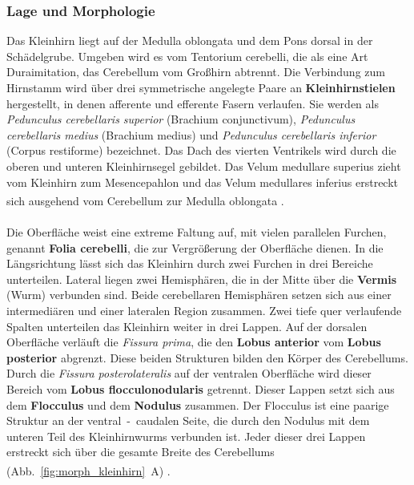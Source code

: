 \documentclass[12pt,a4paper,pdftex]{article}
\begin{document}
\subsubsection{Lage und Morphologie}
Das Kleinhirn liegt auf der Medulla oblongata und dem Pons dorsal in der Schädelgrube. Umgeben wird es vom Tentorium cerebelli, die als eine Art Duraimitation, das Cerebellum vom Großhirn abtrennt. Die Verbindung zum Hirnstamm wird über drei symmetrische angelegte Paare an \textbf{Kleinhirnstielen}  hergestellt, in denen afferente und efferente Fasern verlaufen. Sie werden als \textit{Pedunculus cerebellaris superior} (Brachium conjunctivum), \textit{Pedunculus cerebellaris medius} (Brachium medius)  und \textit{Pedunculus cerebellaris inferior} (Corpus restiforme)  bezeichnet.  Das Dach des vierten Ventrikels wird durch die oberen und unteren Kleinhirnsegel  gebildet. Das Velum medullare superius zieht vom Kleinhirn zum Mesencepahlon und das Velum medullares inferius erstreckt sich ausgehend vom Cerebellum zur Medulla oblongata \textsuperscript{\cite[7]{trepel2011neuroanatomie}}. \\
\\ \noindent Die Oberfläche weist eine extreme Faltung auf, mit vielen parallelen Furchen, genannt \textbf{Folia cerebelli}, die zur Vergrößerung der Oberfläche dienen. In die Längsrichtung lässt sich das Kleinhirn durch zwei Furchen in drei Bereiche unterteilen. Lateral liegen zwei Hemisphären, die in der Mitte über die \textbf{Vermis} (Wurm)  verbunden sind. Beide cerebellaren Hemisphären setzen sich aus einer intermediären und einer lateralen Region zusammen. Zwei tiefe quer verlaufende Spalten unterteilen das Kleinhirn weiter in drei Lappen. Auf der dorsalen Oberfläche verläuft die \textit{Fissura prima}, die den \textbf{Lobus anterior} vom \textbf{Lobus posterior} abgrenzt. Diese beiden Strukturen bilden den Körper des Cerebellums. Durch die \textit{Fissura posterolateralis} auf der ventralen Oberfläche wird dieser Bereich vom \textbf{Lobus flocculonodularis} getrennt. Dieser Lappen setzt sich aus dem \textbf{Flocculus}  und dem \textbf{Nodulus}  zusammen. Der Flocculus ist eine paarige Struktur an der ventral~-~caudalen Seite, die durch den Nodulus mit dem unteren Teil des Kleinhirnwurms verbunden ist. Jeder dieser drei Lappen erstreckt sich über die gesamte Breite des Cerebellums (Abb.~\ref{fig:morph_kleinhirn}~A) \textsuperscript{\cite[42]{kandel2013principles}}. \\
\end{document}
